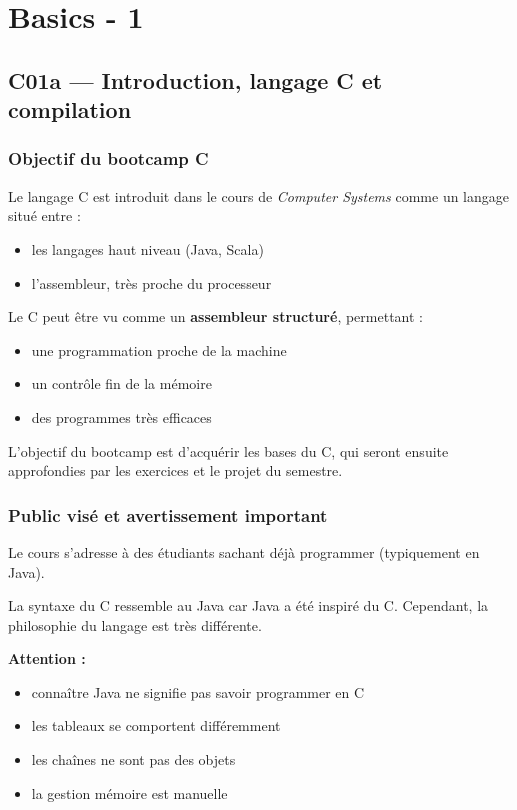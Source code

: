 \chapter{Basics - 1}%
\label{cha:Basics - 1}

\section{C01a — Introduction, langage C et compilation}

\subsection{Objectif du bootcamp C}

Le langage C est introduit dans le cours de \textit{Computer Systems} comme un langage situé entre :

\begin{itemize}
    \item les langages haut niveau (Java, Scala)
    \item l’assembleur, très proche du processeur
\end{itemize}

Le C peut être vu comme un \textbf{assembleur structuré}, permettant :

\begin{itemize}
    \item une programmation proche de la machine
    \item un contrôle fin de la mémoire
    \item des programmes très efficaces
\end{itemize}

L’objectif du bootcamp est d’acquérir les bases du C, qui seront ensuite approfondies par les exercices et le projet du semestre.

\subsection{Public visé et avertissement important}

Le cours s’adresse à des étudiants sachant déjà programmer (typiquement en Java).

La syntaxe du C ressemble au Java car Java a été inspiré du C.
Cependant, la philosophie du langage est très différente.

\textbf{Attention :}
\begin{itemize}
    \item connaître Java ne signifie pas savoir programmer en C
    \item les tableaux se comportent différemment
    \item les chaînes ne sont pas des objets
    \item la gestion mémoire est manuelle
\end{itemize}

